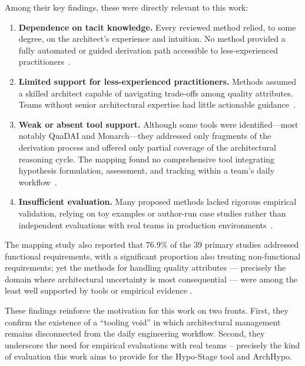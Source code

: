 Among their key findings, these were directly relevant to this work:

\begin{enumerate}
  \item \textbf{Dependence on tacit knowledge.} Every reviewed method relied, to some
  degree, on the architect's experience and intuition. No method provided a fully
  automated or guided derivation path accessible to less-experienced practitioners~\citep{souza2019}.

  \item \textbf{Limited support for less-experienced practitioners.} Methods assumed a
  skilled architect capable of navigating trade-offs among quality attributes. Teams without senior architectural expertise had little actionable guidance~\citep{souza2019}.

  \item \textbf{Weak or absent tool support.} Although some tools were identified—most
  notably QuaDAI and Monarch—they addressed only fragments of the derivation process
  and offered only partial coverage of the architectural reasoning cycle. The mapping
  found no comprehensive tool integrating hypothesis formulation, assessment, and
  tracking within a team's daily workflow~\citep{souza2019}.

  \item \textbf{Insufficient evaluation.} Many proposed methods lacked rigorous
  empirical validation, relying on toy examples or author-run case studies rather than
  independent evaluations with real teams in production
  environments~\citep{souza2019}.
\end{enumerate}

The mapping study also reported that 76.9\% of the 39 primary studies addressed functional
requirements, with a significant proportion also treating non-functional requirements;
yet the methods for handling quality attributes — precisely the domain where architectural
uncertainty is most consequential — were among the least well supported by tools or
empirical evidence \citep{souza2019}.

These findings reinforce the motivation for this work on two fronts. First, they confirm
the existence of a ``tooling void'' in which architectural management remains
disconnected from the daily engineering workflow. Second, they underscore the need for
empirical evaluations with real teams -- precisely the kind of evaluation this work aims
to provide for the Hypo-Stage tool and ArchHypo.
